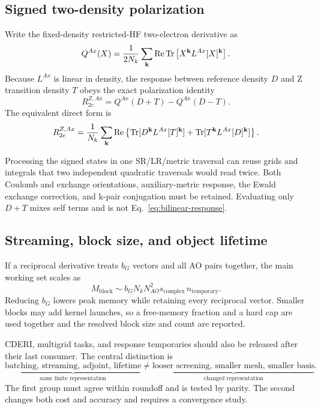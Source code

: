 \subsection{Signed two-density polarization}

Write the fixed-density restricted-HF two-electron derivative as
\begin{equation}
  Q^{Ax}(X)
  =\frac{1}{2N_k}\sum_{\mathbf{k}}\operatorname{Re}
   \operatorname{Tr}\left[X^{\mathbf{k}}L^{Ax}[X]^{\mathbf{k}}\right].
  \label{eq:quadratic-derivative}
\end{equation}
Because $L^{Ax}$ is linear in density, the response between reference density
$D$ and Z transition density $T$ obeys the exact polarization identity
\begin{equation}
  R_{2e}^{Z,Ax}=Q^{Ax}(D+T)-Q^{Ax}(D-T).
  \label{eq:polarization-identity}
\end{equation}
The equivalent direct form is
\begin{equation}
  R_{2e}^{Z,Ax}
  =\frac1{N_k}\sum_{\mathbf{k}}\operatorname{Re}\left\{
    \operatorname{Tr}[D^{\mathbf{k}}L^{Ax}[T]^{\mathbf{k}}]
   +\operatorname{Tr}[T^{\mathbf{k}}L^{Ax}[D]^{\mathbf{k}}]
  \right\}.
  \label{eq:bilinear-response}
\end{equation}

Processing the signed states in one SR/LR/metric traversal can reuse grids
and integrals that two independent quadratic traversals would read twice.
Both Coulomb and exchange orientations, auxiliary-metric response, the Ewald
exchange correction, and k-pair conjugation must be retained.  Evaluating
only $D+T$ mixes self terms and is not Eq.~\eqref{eq:bilinear-response}.

\subsection{Streaming, block size, and object lifetime}

If a reciprocal derivative treats $b_G$ vectors and all AO pairs together,
the main working set scales as
\begin{equation}
  M_{\mathrm{block}}
  \sim b_GN_kN_{AO}^2s_{\mathrm{complex}}\,n_{\mathrm{temporary}}.
  \label{eq:block-working-set}
\end{equation}
Reducing $b_G$ lowers peak memory while retaining every reciprocal vector.
Smaller blocks may add kernel launches, so a free-memory fraction and a hard
cap are used together and the resolved block size and count are reported.

CDERI, multigrid tasks, and response temporaries should also be released
after their last consumer.  The central distinction is
\begin{equation}
  \underbrace{\text{batching, streaming, adjoint, lifetime}}_{\text{same finite representation}}
  \neq
  \underbrace{\text{looser screening, smaller mesh, smaller basis}}_{\text{changed representation}}.
  \label{eq:algebra-vs-approx}
\end{equation}
The first group must agree within roundoff and is tested by parity.  The
second changes both cost and accuracy and requires a convergence study.

